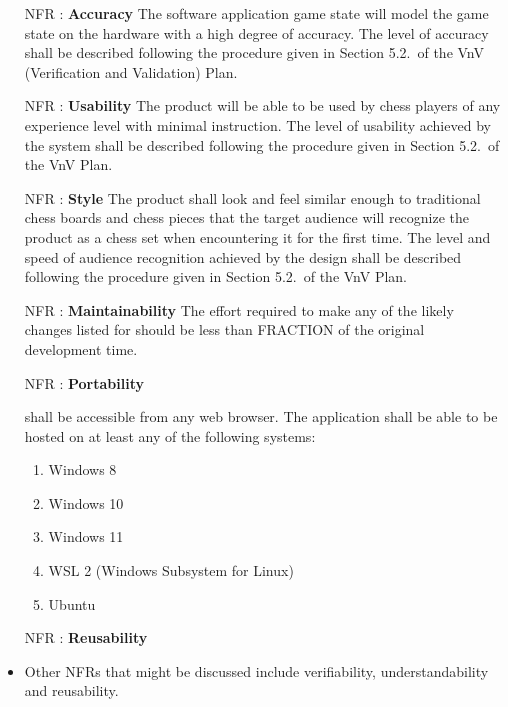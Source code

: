 \documentclass[12pt]{article}
\begin{document}
\noindent \begin{itemize}

\item[NFR\thenfrNum \stepcounter{nfrNum} \label{NFR_Accuracy}:] \textbf{Accuracy}
    {The software application game state will model the game state on the \progname{} hardware with a high degree of accuracy. 
    The level of accuracy shall be described following the procedure given in Section 5.2.\thevnvSectionNfr~of the VnV (Verification and Validation) Plan.}
    
 
\item[NFR\thenfrNum \stepcounter{nfrNum} \label{NFR_Usability}:] \textbf{Usability}
    {The product will be able to be used by chess players of any experience level with minimal instruction.
    The level of usability achieved by the system shall be described following the procedure given in Section 5.2.\thevnvSectionNfr~of the VnV Plan.}

\item[NFR\thenfrNum \stepcounter{nfrNum} \label{NFR_Style}:] \textbf{Style}
    {The product shall look and feel similar enough to traditional chess boards and chess pieces that the target audience will recognize the product 
    as a chess set when encountering it for the first time. The level and speed of audience recognition achieved by the design shall be described 
    following the procedure given in Section 5.2.\thevnvSectionNfr~of the VnV Plan.}

\item[NFR\thenfrNum \stepcounter{nfrNum} \label{NFR_Maintainability}:] \textbf{Maintainability} 
    {The effort required to make any of the likely changes listed for \progname{} should be less than FRACTION of the original development time.}

\item[NFR\thenfrNum \stepcounter{nfrNum} \label{NFR_Portability}:] \textbf{Portability} 
    {\progname{} shall be accessible from any web browser. The application shall be able to be hosted on at least any of the following systems:
    \begin{enumerate}
        \item Windows 8
        \item Windows 10
        \item Windows 11
        \item WSL 2 (Windows Subsystem for Linux)
        \item Ubuntu
    \end{enumerate}}

\item[NFR\thenfrNum \stepcounter{nfrNum} \label{NFR_Reusability}:] \textbf{Reusability}
\item Other NFRs that might be discussed include verifiability,
  understandability and reusability.

\end{itemize}
\end{document}
